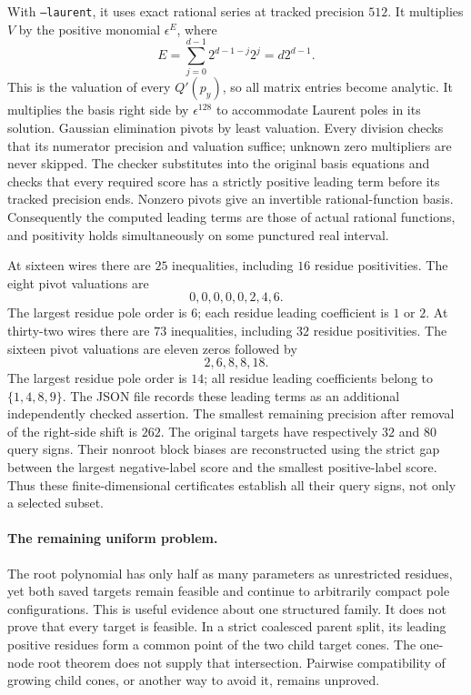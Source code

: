 \documentclass[11pt]{article}
\begin{document}
With \texttt{--laurent}, it uses exact rational series at tracked
precision $512$. It multiplies $V$ by the positive monomial
$\epsilon^E$, where
\[
 E=\sum_{j=0}^{d-1}2^{d-1-j}2^j=d2^{d-1}.
\]
This is the valuation of every $Q'(p_y)$, so all matrix entries become
analytic. It multiplies the basis right side by $\epsilon^{128}$ to
accommodate Laurent poles in its solution. Gaussian elimination pivots
by least valuation. Every division checks that its numerator precision
and valuation suffice; unknown zero multipliers are never skipped.
The checker substitutes into the original basis equations and checks
that every required score has a strictly positive leading term before
its tracked precision ends. Nonzero pivots give an invertible
rational-function basis. Consequently the computed leading terms are
those of actual rational functions, and positivity holds simultaneously
on some punctured real interval.

At sixteen wires there are $25$ inequalities, including $16$ residue
positivities. The eight pivot valuations are
\[
 0,0,0,0,0,2,4,6.
\]
The largest residue pole order is $6$; each residue leading coefficient
is $1$ or $2$. At thirty-two wires there are $73$ inequalities, including
$32$ residue positivities. The sixteen pivot valuations are eleven
zeros followed by
\[
 2,6,8,8,18.
\]
The largest residue pole order is $14$; all residue leading coefficients
belong to $\{1,4,8,9\}$. The JSON file records these leading terms as an
additional independently checked assertion. The smallest remaining
precision after removal of the right-side shift is $262$.
The original targets have respectively $32$ and $80$ query signs.
Their nonroot block biases are reconstructed using the strict gap
between the largest negative-label score and the smallest positive-label
score. Thus these finite-dimensional certificates establish all their
query signs, not only a selected subset.

\paragraph{The remaining uniform problem.}
The root polynomial has only half as many parameters as unrestricted
residues, yet both saved targets remain feasible and continue to
arbitrarily compact pole configurations. This is useful evidence about
one structured family. It does not prove that every target is feasible.
In a strict coalesced parent split, its leading positive residues form
a common point of the two child target cones. The one-node root theorem
does not supply that intersection. Pairwise compatibility of growing
child cones, or another way to avoid it, remains unproved.
\end{document}
